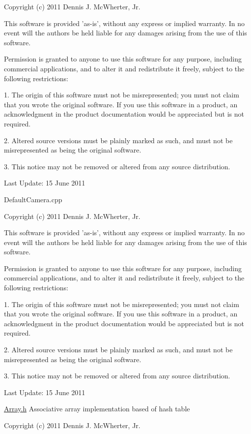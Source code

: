 Copyright (c) 2011 Dennis J. McWherter, Jr.

This software is provided 'as-\/is', without any express or implied warranty. In no event will the authors be held liable for any damages arising from the use of this software.

Permission is granted to anyone to use this software for any purpose, including commercial applications, and to alter it and redistribute it freely, subject to the following restrictions:

1. The origin of this software must not be misrepresented; you must not claim that you wrote the original software. If you use this software in a product, an acknowledgment in the product documentation would be appreciated but is not required.

2. Altered source versions must be plainly marked as such, and must not be misrepresented as being the original software.

3. This notice may not be removed or altered from any source distribution.

Last Update: 15 June 2011

DefaultCamera.cpp

Copyright (c) 2011 Dennis J. McWherter, Jr.

This software is provided 'as-\/is', without any express or implied warranty. In no event will the authors be held liable for any damages arising from the use of this software.

Permission is granted to anyone to use this software for any purpose, including commercial applications, and to alter it and redistribute it freely, subject to the following restrictions:

1. The origin of this software must not be misrepresented; you must not claim that you wrote the original software. If you use this software in a product, an acknowledgment in the product documentation would be appreciated but is not required.

2. Altered source versions must be plainly marked as such, and must not be misrepresented as being the original software.

3. This notice may not be removed or altered from any source distribution.

Last Update: 15 June 2011

\hyperlink{_array_8h_source}{Array.h} Associative array implementation based of hash table

Copyright (c) 2011 Dennis J. McWherter, Jr.


